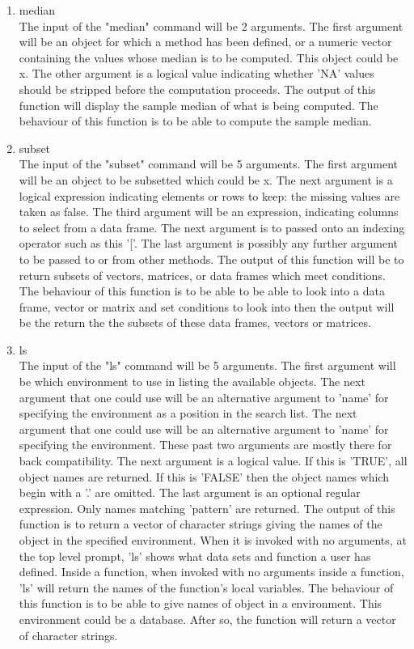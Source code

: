 \documentclass{article}
\begin{document}
\begin{enumerate}
\begin{enumerate}
\item {median}
\\
The input of the "median" command will be 2 arguments. The first argument will be an object for which a method has been defined, or a numeric vector containing the values whose median is to be computed. This object could be x. The other argument is a logical value indicating whether 'NA' values should be stripped before the computation proceeds. The output of this function will display the sample median of what is being computed. The behaviour of this function is to be able to compute the sample median.
\\
\item {subset}
\\
The input of the "subset" command will be 5 arguments. The first argument will be an object to be subsetted which could be x. The next argument is a logical expression indicating elements or rows to keep: the missing values are taken as false. The third argument will be an expression, indicating columns to select from a data frame. The next argument is to passed onto an indexing operator such as this '['. The last argument is possibly any further argument to be passed to or from other methods. The output of this function will be to return subsets of vectors, matrices, or data frames which meet conditions. The behaviour of this function is to be able to be able to look into a data frame, vector or matrix and set conditions to look into then the output will be the return the the subsets of these data frames, vectors or matrices.
\\
\item {ls}
\\
The input of the "ls" command will be 5 arguments. The first argument will be which environment to use in listing the available objects. The next argument that one could use will be an alternative argument to 'name' for specifying the environment as a position in the search list. The next argument that one could use will be an alternative argument to 'name' for specifying the environment. These past two arguments are mostly there for back compatibility. The next argument is a logical value. If this is 'TRUE', all object names are returned. If this is 'FALSE' then the object names which begin with a '.' are omitted. The last argument is an optional regular expression. Only names matching 'pattern' are returned. The output of this function is to return a vector of character strings giving the names of the object in the specified environment. When it is invoked with no arguments, at the top level prompt, 'ls' shows what data sets and function a user has defined. Inside a function, when invoked with no arguments inside a function, 'ls' will return the names of the function's local variables. The behaviour of this function is to be able to give names of object in a environment. This environment could be a database. After so, the function will return a vector of character strings.  

\end{enumerate}
\end{enumerate}
\end{document}
